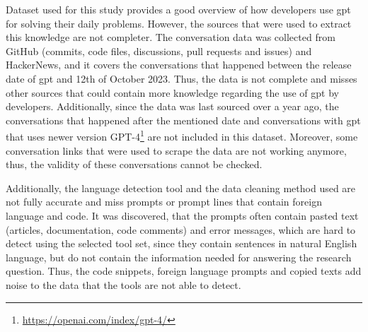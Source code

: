 Dataset used for this study provides a good overview of how developers use \acrshort{gpt} for solving their daily problems. However, the sources that were used to extract this knowledge are not completer. The conversation data was collected from GitHub (commits, code files, discussions, pull requests and issues) and HackerNews, and it covers the conversations that happened between the release date of \acrshort{gpt} and 12th of October 2023. Thus, the data is not complete and misses other sources that could contain more knowledge regarding the use of \acrshort{gpt} by developers. Additionally, since the data was last sourced over a year ago, the conversations that happened after the mentioned date and conversations with \acrshort{gpt} that uses newer version GPT-4\footnote{\url{https://openai.com/index/gpt-4/}} are not included in this dataset. Moreover, some conversation links that were used to scrape the data are not working anymore, thus, the validity of these conversations cannot be checked.

Additionally, the language detection tool and the data cleaning method used are not fully accurate and miss prompts or prompt lines that contain foreign language and code. It was discovered, that the prompts often contain pasted text (articles, documentation, code comments) and error messages, which are hard to detect using the selected tool set, since they contain sentences in natural English language, but do not contain the information needed for answering the research question. Thus, the code snippets, foreign language prompts and copied texts add noise to the data that the tools are not able to detect.